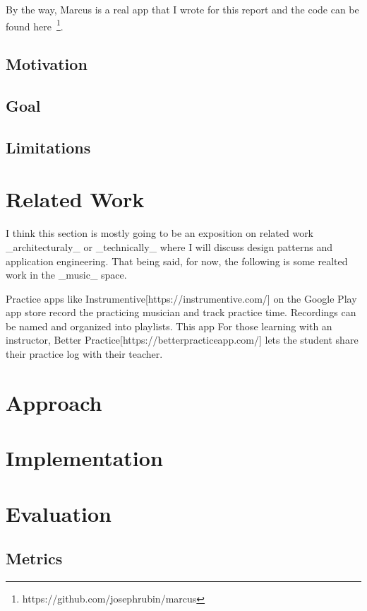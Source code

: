 \documentclass{article}
\begin{document}
By the way, Marcus is a real app that I wrote for this report and the code can be found here~\footnote{https://github.com/josephrubin/marcus}.

\subsection{Motivation} 


\subsection{Goal}

\subsection{Limitations}


\section{Related Work}

I think this section is mostly going to be an exposition on related work \_architecturaly\_ or \_technically\_ where I will discuss design patterns and application engineering.
That being said, for now, the following is some realted work in the \_music\_ space.

Practice apps like Instrumentive[https://instrumentive.com/] on the Google Play app store record the practicing musician and track practice time.
Recordings can be named and organized into playlists.
This app 
For those learning with an instructor, Better Practice[https://betterpracticeapp.com/] lets the student share their practice log with their teacher.


\section{Approach} 
\section{Implementation}
\section{Evaluation}
\subsection{Metrics}
\end{document}

